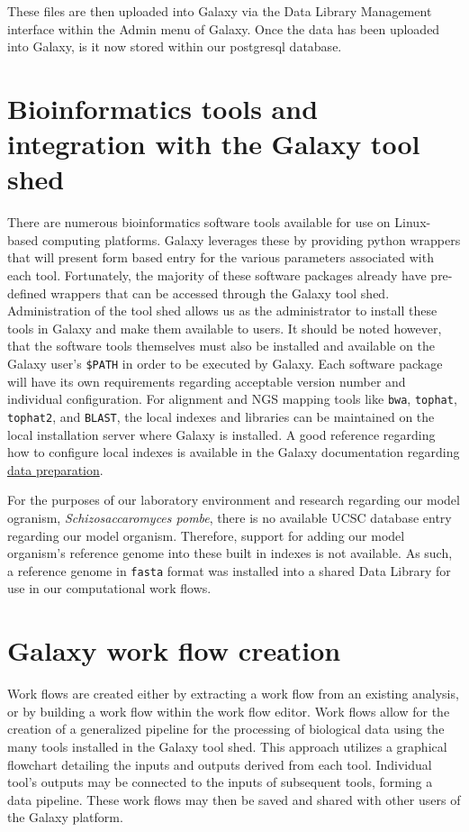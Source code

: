 \documentclass[a4paper,10pt]{article}
\begin{document}
These files are then uploaded into Galaxy via the Data Library Management interface within the Admin menu of Galaxy.  Once the data has been uploaded into Galaxy, is it now stored within our postgresql database.

\section{Bioinformatics tools and integration with the Galaxy tool shed}
There are numerous bioinformatics software tools available for use on Linux-based computing platforms.  Galaxy leverages these by providing python wrappers that will present form based entry for the various parameters associated with each tool.  Fortunately, the majority of these software packages already have pre-defined wrappers that can be accessed through the Galaxy tool shed.  Administration of the tool shed allows us as the administrator to install these tools in Galaxy and make them available to users.  It should be noted however, that the software tools themselves must also be installed and available on the Galaxy user's \texttt{\footnotesize{\$PATH}} in order to be executed by Galaxy.  Each software package will have its own requirements regarding acceptable version number and individual configuration.  For alignment and NGS mapping tools like \texttt{\footnotesize{bwa}}, \texttt{\footnotesize{tophat}}, \texttt{\footnotesize{tophat2}}, and \texttt{\footnotesize{BLAST}}, the local indexes and libraries can be maintained on the local installation server where Galaxy is installed.  A good reference regarding how to configure local indexes is available in the Galaxy documentation regarding \href{https://wiki.galaxyproject.org/Admin/DataPreparation}{data preparation}.

For the purposes of our laboratory environment and research regarding our model ogranism, \textit{Schizosaccaromyces pombe}, there is no available UCSC database entry regarding our model organism.  Therefore, support for adding our model organism's reference genome into these built in indexes is not available.  As such, a reference genome in \texttt{\footnotesize{fasta}} format was installed into a shared Data Library for use in our computational work flows.  

\section{Galaxy work flow creation}
Work flows are created either by extracting a work flow from an existing analysis, or by building a work flow within the work flow editor.  Work flows allow for the creation of a generalized pipeline for the processing of biological data using the many tools installed in the Galaxy tool shed.  This approach utilizes a graphical flowchart detailing the inputs and outputs derived from each tool.  Individual tool's outputs may be connected to the inputs of subsequent tools, forming a data pipeline.  These work flows may then be saved and shared with other users of the Galaxy platform.
\end{document}

